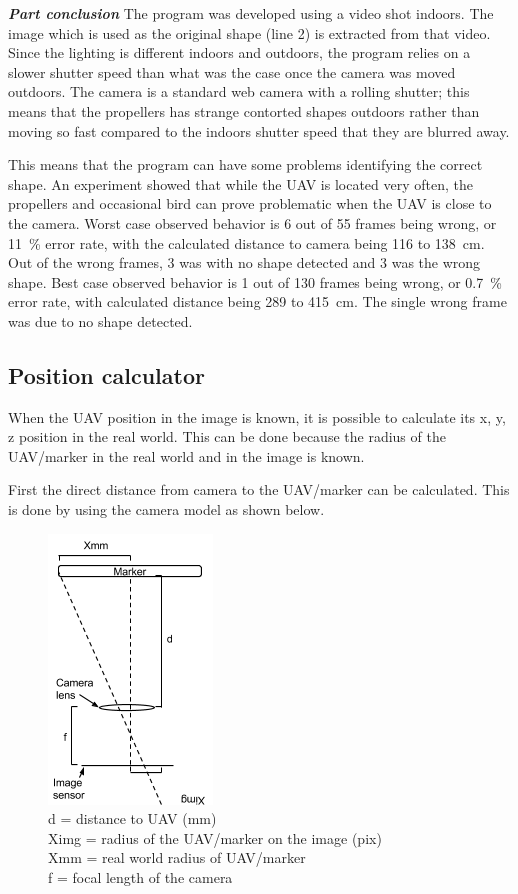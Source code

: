 \emph{\textbf{Part conclusion}}
The program was developed using a video shot indoors. The image which is used as the original shape (line 2) is extracted from that video. Since the lighting is different indoors and outdoors, the program relies on a slower shutter speed than what was the case once the camera was moved outdoors. The camera is a standard web camera with a rolling shutter; this means that the propellers has strange contorted shapes outdoors rather than moving so fast compared to the indoors shutter speed that they are blurred away. 

This means that the program can have some problems identifying the correct shape. An experiment showed that while the UAV is located very often, the propellers and occasional bird can prove problematic when the UAV is close to the camera. Worst case observed behavior is 6 out of 55 frames being wrong, or \SI{11}{\percent} error rate, with the calculated distance to camera being 116 to \SI{138}{\centi\meter}. Out of the wrong frames, 3 was with no shape detected and 3 was the wrong shape. Best case observed behavior is 1 out of 130 frames being wrong, or \SI{0.7}{\percent} error rate, with calculated distance being 289 to \SI{415}{\centi\meter}. The single wrong frame was due to no shape detected.
\subsection{Position calculator}
When the UAV position in the image is known, it is possible to calculate its x, y, z position in the real world. This can be done because the radius of the UAV/marker in the real world and in the image is known. 

First the direct distance from camera to the UAV/marker can be calculated. This is done by using the camera model as shown below.
\begin{figure}[h!]
	\centering
	\includegraphics{imgs/focal_length}\\
	d = distance to UAV (\si{\milli\meter})\\
	Ximg = radius of the UAV/marker on the image (pix)\\
	Xmm = real world radius of UAV/marker\\
	f = focal length of the camera
\end{figure}

